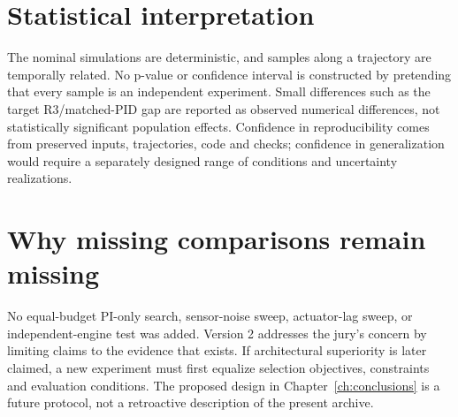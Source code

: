 \section{Statistical interpretation}
The nominal simulations are deterministic, and samples along a trajectory are temporally related. No p-value or confidence interval is constructed by pretending that every sample is an independent experiment. Small differences such as the target R3/matched-PID gap are reported as observed numerical differences, not statistically significant population effects. Confidence in reproducibility comes from preserved inputs, trajectories, code and checks; confidence in generalization would require a separately designed range of conditions and uncertainty realizations.

\section{Why missing comparisons remain missing}
No equal-budget PI-only search, sensor-noise sweep, actuator-lag sweep, or independent-engine test was added. Version 2 addresses the jury's concern by limiting claims to the evidence that exists. If architectural superiority is later claimed, a new experiment must first equalize selection objectives, constraints and evaluation conditions. The proposed design in Chapter~\ref{ch:conclusions} is a future protocol, not a retroactive description of the present archive.
